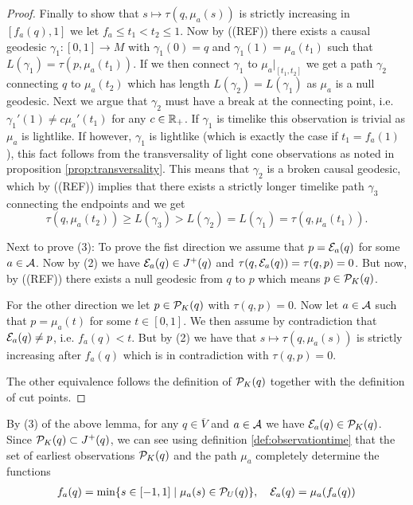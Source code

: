 \begin{proof}
Finally to show that $s\mapsto \tau(q,\mu_a(s))$ is strictly increasing in $[f_a(q),1]$ we let $f_a\leq t_1<t_2\leq 1$. Now by ((REF)) there exists a causal geodesic $\gamma_1:[0,1]\to M$ with $\gamma_1(0)=q$ and $\gamma_1(1)=\mu_a(t_1)$ such that $L(\gamma_1)=\tau(p,\mu_a(t_1))$. 
If we then connect $\gamma_1$ to $\mu_a\rvert_{[t_1,t_2]}$ we get a path $\gamma_2$ connecting $q$ to $\mu_a(t_2)$ which has length $L(\gamma_2) = L(\gamma_1)$ as $\mu_a$ is a null geodesic. Next we argue that $\gamma_2$ must have a break at the connecting point, i.e. $\gamma_1'(1) \neq c\mu_a'(t_1)$ for any $c\in \R_+$. If $\gamma_1$ is timelike this observation is trivial as $\mu_a$ is lightlike. If however, $\gamma_1$ is lightlike (which is exactly the case if $t_1=f_a(1)$), this fact follows from the transversality of light cone observations as noted in proposition \ref{prop:transversality}. This means that $\gamma_2$ is a broken causal geodesic, which by ((REF)) implies that there exists a strictly longer timelike path $\gamma_3$ connecting the endpoints and we get
\[
\tau(q,\mu_a(t_2)) \geq L(\gamma_3) > L(\gamma_2) = L(\gamma_1) = \tau(q,\mu_a(t_1)).
\]

Next to prove (3):
To prove the fist direction we assume that $p=\mc{E}_a(q)$ for some $a\in \mc{A}$. Now by (2) we have $\mc{E}_a(q) \in J^+(q)$ and $\tau(q,\mc{E}_a(q))=\tau(q,p)=0$. But now, by ((REF)) there exists a null geodesic from $q$ to $p$ which means $p\in \mc{P}_K(q)$. 

For the other direction we let $p\in \mc{P}_K(q)$ with $\tau(q,p)=0$. Now let $a\in \mc{A}$ such that $p=\mu_a(t)$ for some $t\in [0,1]$. We then assume by contradiction that $\mc{E}_a(q) \neq p$, i.e. $f_a(q) < t$. But by (2) we have that $s\mapsto\tau(q,\mu_a(s))$ is strictly increasing after $f_a(q)$ which is in contradiction with $\tau(q,p)=0$.

The other equivalence follows the definition of $\mc{P}_K(q)$ together with the definition of cut points.
\end{proof}

By (3) of the above lemma, for any $q\in \overline{V}$ and $a\in \ca$ we have $\mc{E}_a(q)\in \P_K(q)$. Since $\P_K(q)\subset J^+(q)$, we can see using definition \ref{def:observationtime} that the set of earliest observations $\P_K(q)$ and the path $\mu_a$ completely determine the functions
\begin{align}\label{eq:observationtimerestated}
    f_a(q) = \min \{ s\in [-1,1] \mid \mu_a(s)\in \P_U(q) \}, \quad \mc{E}_a(q) = \mu_a(f_a(q))
\end{align}

